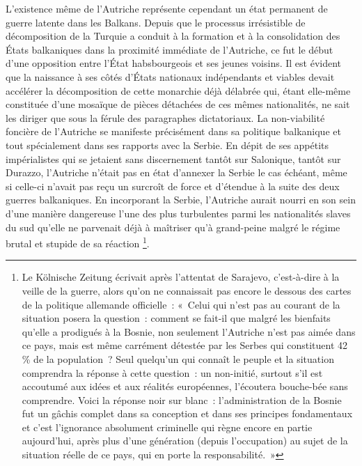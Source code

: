 \documentclass[french,twoside]{book} %
\begin{document}
L'existence même de l’Autriche représente cependant un état permanent de guerre latente dans les Balkans. Depuis que le processus irrésistible de décomposition de la Turquie a conduit à la formation et à la consolidation des États balkaniques dans la proximité immédiate de l’Autriche, ce fut le début d’une opposition entre l’État habsbourgeois et ses jeunes voisins. Il est évident que la naissance à ses côtés d’États nationaux indépendants et viables devait accélérer la décomposition de cette monarchie déjà délabrée qui, étant elle-même constituée d’une mosaïque de pièces détachées de ces mêmes nationalités, ne sait les diriger que sous la férule des paragraphes dictatoriaux. La non-viabilité foncière de l’Autriche se manifeste précisément dans sa politique balkanique et tout spécialement dans ses rapports avec la Serbie. En dépit de ses appétits impérialistes qui se jetaient sans discernement tantôt sur Salonique, tantôt sur Durazzo, l’Autriche n’était pas en état d’annexer la Serbie le cas échéant, même si celle-ci n’avait pas reçu un surcroît de force et d’étendue à la suite des deux guerres balkaniques. En incorporant la Serbie, l’Autriche aurait nourri en son sein d’une manière dangereuse l’une des plus turbulentes parmi les nationalités slaves du sud qu’elle ne parvenait déjà à maîtriser qu’à grand-peine malgré le régime brutal et stupide de sa réaction \footnote{Le Kölnische Zeitung écrivait après l’attentat de Sarajevo, c’est-à-dire à la veille de la guerre, alors qu’on ne connaissait pas encore le dessous des cartes de la politique allemande officielle : « Celui qui n’est pas au courant de la situation posera la question : comment se fait-il que malgré les bienfaits qu’elle a prodigués à la Bosnie, non seulement l’Autriche n’est pas aimée dans ce pays, mais est même carrément détestée par les Serbes qui constituent 42 \% de la population ? Seul quelqu’un qui connaît le peuple et la situation comprendra la réponse à cette question : un non-initié, surtout s’il est accoutumé aux idées et aux réalités européennes, l’écoutera bouche-bée sans comprendre. Voici la réponse noir sur blanc : l’administration de la Bosnie fut un gâchis complet dans sa conception et dans ses principes fondamentaux et c’est l’ignorance absolument criminelle qui règne encore en partie aujourd’hui, après plus d’une génération (depuis l’occupation) au sujet de la situation réelle de ce pays, qui en porte la responsabilité. »}.\par
\end{document}
